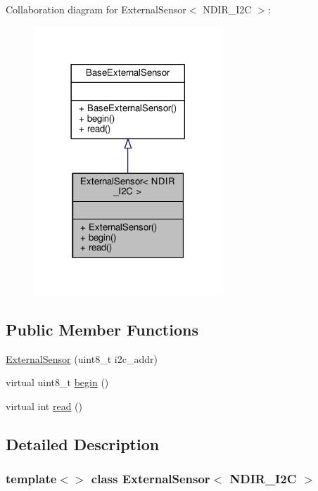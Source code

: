 Collaboration diagram for External\+Sensor$<$ N\+D\+I\+R\+\_\+\+I2C $>$\+:
\nopagebreak
\begin{figure}[H]
\begin{center}
\leavevmode
\includegraphics[width=201pt]{d2/d03/class_external_sensor_3_01_n_d_i_r___i2_c_01_4__coll__graph}
\end{center}
\end{figure}
\subsection*{Public Member Functions}
\begin{DoxyCompactItemize}
\item 
\hyperlink{class_external_sensor_3_01_n_d_i_r___i2_c_01_4_aa06970ea689679c0e1deb5360e05a0a4}{External\+Sensor} (uint8\+\_\+t i2c\+\_\+addr)
\item 
virtual uint8\+\_\+t \hyperlink{class_external_sensor_3_01_n_d_i_r___i2_c_01_4_ac6f3614d94968ef0cc11b2b4d69cef03}{begin} ()
\item 
virtual int \hyperlink{class_external_sensor_3_01_n_d_i_r___i2_c_01_4_add67f5ecaf47d2ee675e8299aee7322d}{read} ()
\end{DoxyCompactItemize}


\subsection{Detailed Description}
\subsubsection*{template$<$$>$\newline
class External\+Sensor$<$ N\+D\+I\+R\+\_\+\+I2\+C $>$}


